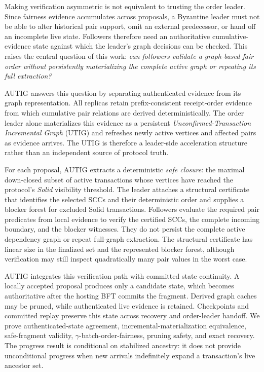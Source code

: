 Making verification asymmetric is not equivalent to trusting the order
leader.  Since fairness evidence accumulates across proposals, a Byzantine
leader must not be able to alter historical pair support, omit an external
predecessor, or hand off an incomplete live state.  Followers therefore need
an authoritative cumulative-evidence state against which the leader's graph
decisions can be checked.  This raises the central question of this work:
\emph{can followers validate a graph-based fair order without persistently
materializing the complete active graph or repeating its full extraction?}

AUTIG answers this question by separating authenticated evidence from its
graph representation.  All replicas retain prefix-consistent receipt-order
evidence from which cumulative pair relations are derived deterministically.
The order leader alone materializes this evidence as a persistent
\emph{Unconfirmed-Transaction Incremental Graph} (UTIG) and refreshes newly
active vertices and affected pairs as evidence arrives.  The UTIG is therefore
a leader-side acceleration structure rather than an independent source of
protocol truth.

For each proposal, AUTIG extracts a deterministic \emph{safe closure}: the
maximal down-closed subset of active transactions whose vertices have reached
the protocol's \emph{Solid} visibility threshold.  The leader attaches a
structural certificate that identifies the selected SCCs and their
deterministic order and supplies a blocker forest for excluded Solid
transactions.  Followers evaluate the required pair predicates from local
evidence to verify the certified SCCs, the complete incoming boundary, and the
blocker witnesses.  They do not persist the complete active dependency graph
or repeat full-graph extraction.  The structural certificate has linear size
in the finalized set and the represented blocker forest, although verification
may still inspect quadratically many pair values in the worst case.

AUTIG integrates this verification path with committed state continuity.  A
locally accepted proposal produces only a candidate state, which becomes
authoritative after the hosting BFT commits the fragment.  Derived graph
caches may be pruned, while authenticated live evidence is retained.
Checkpoints and committed replay preserve this state across recovery and
order-leader handoff.  We prove authenticated-state agreement,
incremental-materialization equivalence, safe-fragment validity,
$\gamma$-batch-order-fairness, pruning safety, and exact recovery.  The
progress result is conditional on stabilized ancestry: it does not provide
unconditional progress when new arrivals indefinitely expand a transaction's
live ancestor set.

